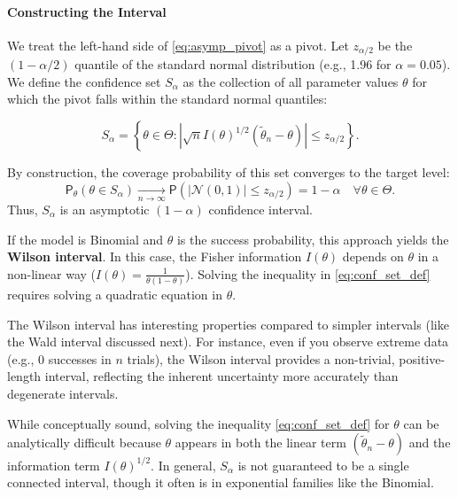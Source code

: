 \paragraph{Constructing the Interval}
We treat the left-hand side of \eqref{eq:asymp_pivot} as a pivot. Let $z_{\alpha/2}$ be the $(1 - \alpha/2)$ quantile of the standard normal distribution (e.g., 1.96 for $\alpha=0.05$). We define the confidence set $S_{\alpha}$ as the collection of all parameter values $\theta$ for which the pivot falls within the standard normal quantiles:

\begin{equation}
\label{eq:conf_set_def}
S_{\alpha} = \left\{ \theta \in \Theta : \left| \sqrt{n} I(\theta)^{1/2} (\tilde{\theta}_n - \theta) \right| \le z_{\alpha/2} \right\}.
\end{equation}

By construction, the coverage probability of this set converges to the target level:
\[
\mathsf{P}_{\theta}(\theta \in S_{\alpha}) \underset{n \to \infty}{\longrightarrow} \mathsf{P}(|\mathcal{N}(0, 1)| \le z_{\alpha/2}) = 1 - \alpha \quad \forall \theta \in \Theta.
\]
Thus, $S_{\alpha}$ is an asymptotic $(1 - \alpha)$ confidence interval.

\begin{ex}
    If the model is Binomial and $\theta$ is the success probability, this approach yields the \textbf{Wilson interval}.
    In this case, the Fisher information $I(\theta)$ depends on $\theta$ in a non-linear way ($I(\theta) = \frac{1}{\theta(1-\theta)}$). Solving the inequality in \eqref{eq:conf_set_def} requires solving a quadratic equation in $\theta$.
    
    The Wilson interval has interesting properties compared to simpler intervals (like the Wald interval discussed next). For instance, even if you observe extreme data (e.g., 0 successes in $n$ trials), the Wilson interval provides a non-trivial, positive-length interval, reflecting the inherent uncertainty more accurately than degenerate intervals.
\end{ex}

\begin{note}
    While conceptually sound, solving the inequality \eqref{eq:conf_set_def} for $\theta$ can be analytically difficult because $\theta$ appears in both the linear term $(\tilde{\theta}_n - \theta)$ and the information term $I(\theta)^{1/2}$. In general, $S_\alpha$ is not guaranteed to be a single connected interval, though it often is in exponential families like the Binomial.
\end{note}

